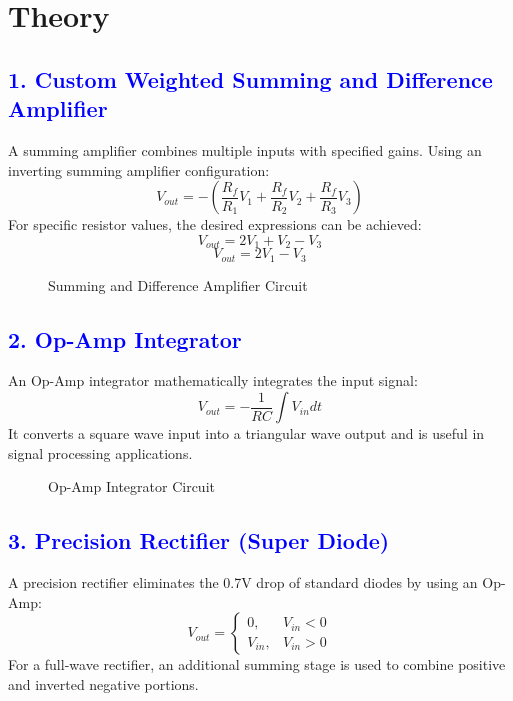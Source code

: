 \documentclass[a4paper,12pt]{article}
\begin{document}
\section*{Theory}
\subsection*{\textcolor{blue}{1. Custom Weighted Summing and Difference Amplifier}}
A summing amplifier combines multiple inputs with specified gains. Using an inverting summing amplifier configuration:
\begin{equation}
V_{out} = -\left(\frac{R_f}{R_1}V_1 + \frac{R_f}{R_2}V_2 + \frac{R_f}{R_3}V_3\right)
\end{equation}
For specific resistor values, the desired expressions can be achieved:
\begin{equation}
V_{out} = 2V_1 + V_2 - V_3
\end{equation}
\begin{equation}
V_{out} = 2V_1 - V_3
\end{equation}

\begin{figure}[H]
    \centering
    
    \caption{Summing and Difference Amplifier Circuit}
\end{figure}

\subsection*{\textcolor{blue}{2. Op-Amp Integrator}}
An Op-Amp integrator mathematically integrates the input signal:
\begin{equation}
V_{out} = -\frac{1}{RC} \int V_{in} dt
\end{equation}
It converts a square wave input into a triangular wave output and is useful in signal processing applications.

\begin{figure}[H]
    \centering
    
    \caption{Op-Amp Integrator Circuit}
\end{figure}

\subsection*{\textcolor{blue}{3. Precision Rectifier (Super Diode)}}
A precision rectifier eliminates the 0.7V drop of standard diodes by using an Op-Amp:
\begin{equation}
V_{out} = \begin{cases} 0, & V_{in} < 0 \\ V_{in}, & V_{in} > 0 \end{cases}
\end{equation}
For a full-wave rectifier, an additional summing stage is used to combine positive and inverted negative portions.
\end{document}
